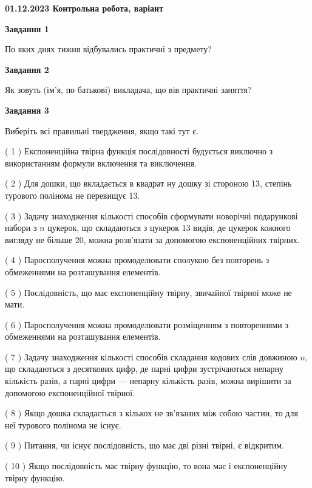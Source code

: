 \documentclass[12pt, ukrainian]{article}
\begin{document}
\begin {large}

\textbf{01.12.2023 Контрольна робота, варіант  }\par


{
{\begin {center}\textbf{Завдання 1}\end {center}}\par
По яких днях тижня відбувались практичні з предмету?\par
{\begin {center}\textbf{Завдання 2}\end {center}}\par
Як зовуть (ім'я, по батькові) викладача, що вів практичні заняття?\par
{\begin {center}\textbf{Завдання 3}\end {center}}\par
Виберіть всі правильні твердження, якщо такі тут є.\par
\vspace{2mm}
( 1 ) Експоненційна твірна функція послідовності будується виключно з використанням формули включення та виключення.%

( 2 ) Для дошки, що вкладається в квадрат ну дошку зі стороною 13, степінь турового полінома не перевищує 13.%

( 3 ) Задачу знаходження кількості способів сформувати новорічні подарункові набори з $n$ цукерок, що складаються з цукерок 13 видів, де цукерок кожного вигляду не більше 20, можна розв’язати за допомогою експоненційних твірних.%

( 4 ) Паросполучення можна промоделювати сполукою без повторень з обмеженнями на розташування елементів.%

( 5 ) Послідовність, що має експоненційну твірну, звичайної твірної може не мати.%

( 6 ) Паросполучення можна промоделювати розміщенням з повтореннями з обмеженнями на розташування елементів.%

( 7 ) Задачу знаходження кількості способів складання кодових слів довжиною $n$, що складаються з десяткових цифр, де парні цифри зустрічаються непарну кількість разів, а парні цифри — непарну кількість разів, можна вирішити за допомогою експоненційної твірної.%

( 8 ) Якщо дошка складається з кількох не зв’язаних між собою частин, то для неї турового полінома не існує.%

( 9 ) Питання, чи існує послідовність, що має дві різні твірні, є відкритим.%

( 10 ) Якщо послідовність має твірну функцію, то вона має і експоненційну твірну функцію.%
}
\end {large}

\vspace{4mm}
\newpage
\end{document}
